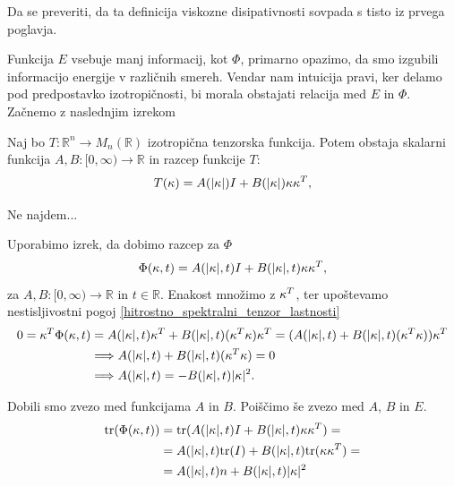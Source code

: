 \documentclass[mat2, tisk]{fmfdelo}
\newcommand{\R}{\mathbb R}
\newcommand{\bd}{\textbf}
\begin{document}
\begin{opomba}
Da se preveriti, da ta definicija viskozne disipativnosti sovpada s tisto iz 
prvega poglavja.
\end{opomba}

Funkcija $E$ vsebuje manj informacij, kot $\Phi$, primarno opazimo, 
da smo izgubili informacijo energije v različnih smereh. Vendar nam intuicija pravi, 
ker delamo pod predpostavko izotropičnosti, bi morala obstajati relacija med 
$E$ in $\Phi$. Začnemo z naslednjim izrekom 
\begin{izrek}
Naj bo $T: \R^n \rightarrow M_n(\R)$ izotropična tenzorska funkcija. 
Potem obstaja skalarni funkcija $A, B: [0, \infty) \rightarrow \R$ in razcep 
funkcije $T$: 
\begin{equation}
T(\text{\bd{$\kappa$}}) = A(|\text{\bd{$\kappa$}}|) I + B(|\text{\bd{$\kappa$}}|) \text{\bd{$\kappa$}} \text{\bd{$\kappa$}}^T,
\end{equation}
\end{izrek}

\begin{dokaz}
Ne najdem...
\end{dokaz}

Uporabimo izrek, da dobimo razcep za $\Phi$
\begin{equation}
\Phi(\text{\bd{$\kappa$}}, t) = A(|\text{\bd{$\kappa$}}|, t) I + B(|\text{\bd{$\kappa$}}|, t) \text{\bd{$\kappa$}} \text{\bd{$\kappa$}}^T,
\end{equation}
za $A, B: [0, \infty) \rightarrow \R$ in $t\in \R$. Enakost množimo z 
$\text{\bd{$\kappa$}}^T$, ter upoštevamo nestisljivostni pogoj \ref{hitrostno_spektralni_tenzor_lastnosti}
\begin{align*}
0 = \text{\bd{$\kappa$}}^T \Phi(\text{\bd{$\kappa$}}, t) &= A(|\text{\bd{$\kappa$}}|, t) \text{\bd{$\kappa$}}^T  + B(|\text{\bd{$\kappa$}}|, t) (\text{\bd{$\kappa$}}^T \text{\bd{$\kappa$}}) \text{\bd{$\kappa$}}^T = (A(|\text{\bd{$\kappa$}}|, t)  + B(|\text{\bd{$\kappa$}}|, t) (\text{\bd{$\kappa$}}^T \text{\bd{$\kappa$}})) \text{\bd{$\kappa$}}^T \\
&\Longrightarrow A(|\text{\bd{$\kappa$}}|, t)  + B(|\text{\bd{$\kappa$}}|, t) (\text{\bd{$\kappa$}}^T \text{\bd{$\kappa$}}) = 0 \\
&\Longrightarrow A(|\text{\bd{$\kappa$}}|, t) = -B(|\text{\bd{$\kappa$}}|, t) |\text{\bd{$\kappa$}}|^2.
\end{align*}

Dobili smo zvezo med funkcijama $A$ in $B$. Poiščimo še zvezo med 
$A$, $B$ in $E$. 
\begin{align*}
\text{tr}(\Phi(\text{\bd{$\kappa$}}, t)) &= \text{tr}(A(|\text{\bd{$\kappa$}}|, t) I + B(|\text{\bd{$\kappa$}}|, t) \text{\bd{$\kappa$}} \text{\bd{$\kappa$}}^T) = \\
&= A(|\text{\bd{$\kappa$}}|, t) \text{tr}(I) + B(|\text{\bd{$\kappa$}}|, t) \text{tr}(\text{\bd{$\kappa$}} \text{\bd{$\kappa$}}^T) = \\
&= A(|\text{\bd{$\kappa$}}|, t) n + B(|\text{\bd{$\kappa$}}|, t) |\text{\bd{$\kappa$}}|^2 
\end{align*}
\end{document}
